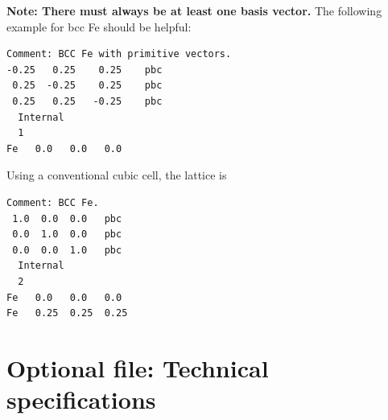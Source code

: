 \documentclass[a4paper,12pt,pdftex,onecolumn]{article}
\begin{document}
\textbf{Note: There must always be at least one basis vector.}
The following example for bcc Fe should be helpful:

\begin{Verbatim}[fontsize=\relsize{-1},frame=single]
Comment: BCC Fe with primitive vectors.
-0.25   0.25    0.25    pbc
 0.25  -0.25    0.25    pbc
 0.25   0.25   -0.25    pbc
  Internal
  1
Fe   0.0   0.0   0.0
\end{Verbatim}

Using a conventional cubic cell, the lattice is

\begin{Verbatim}[fontsize=\relsize{-1},frame=single]
Comment: BCC Fe.
 1.0  0.0  0.0   pbc
 0.0  1.0  0.0   pbc
 0.0  0.0  1.0   pbc
  Internal
  2
Fe   0.0   0.0   0.0
Fe   0.25  0.25  0.25
\end{Verbatim}







\section{Optional file: Technical specifications}
\end{document}
